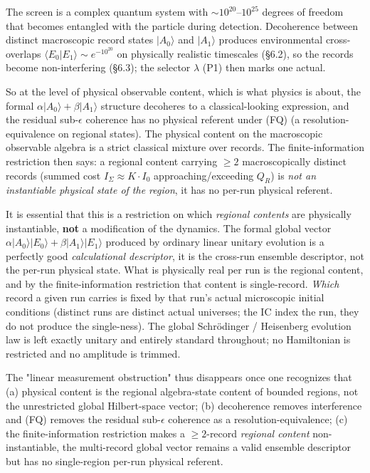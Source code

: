 \documentclass[11pt,a4paper]{article}
\begin{document}
The screen is a complex quantum system with $\sim 10^{20}$–$10^{25}$ degrees of freedom that becomes entangled with the particle during detection. Decoherence between distinct macroscopic record states $|A_0\rangle$ and $|A_1\rangle$ produces environmental cross-overlaps $\langle E_0 | E_1 \rangle \sim e^{-10^{20}}$ on physically realistic timescales (§6.2), so the records become non-interfering (§6.3); the selector $\lambda$ (P1) then marks one actual.

So at the level of physical observable content, which is what physics is about, the formal $\alpha|A_0\rangle + \beta|A_1\rangle$ structure decoheres to a classical-looking expression, and the residual sub-$\epsilon$ coherence has no physical referent under (FQ) (a resolution-equivalence on regional states). The physical content on the macroscopic observable algebra is a strict classical mixture over records. The finite-information restriction then says: a regional content carrying $\ge 2$ macroscopically distinct records (summed cost $I_\Sigma \approx K\cdot I_0$ approaching/exceeding $Q_R$) is \emph{not an instantiable physical state of the region}, it has no per-run physical referent.

It is essential that this is a restriction on which \emph{regional contents} are physically instantiable, \textbf{not} a modification of the dynamics. The formal global vector $\alpha|A_0\rangle|E_0\rangle + \beta|A_1\rangle|E_1\rangle$ produced by ordinary linear unitary evolution is a perfectly good \emph{calculational descriptor}, it is the cross-run ensemble descriptor, not the per-run physical state. What is physically real per run is the regional content, and by the finite-information restriction that content is single-record. \emph{Which} record a given run carries is fixed by that run's actual microscopic initial conditions (distinct runs are distinct actual universes; the IC index the run, they do not produce the single-ness). The global Schrödinger / Heisenberg evolution law is left exactly unitary and entirely standard throughout; no Hamiltonian is restricted and no amplitude is trimmed.

The "linear measurement obstruction" thus disappears once one recognizes that (a) physical content is the regional algebra-state content of bounded regions, not the unrestricted global Hilbert-space vector; (b) decoherence removes interference and (FQ) removes the residual sub-$\epsilon$ coherence as a resolution-equivalence; (c) the finite-information restriction makes a $\ge 2$-record \emph{regional content} non-instantiable, the multi-record global vector remains a valid ensemble descriptor but has no single-region per-run physical referent.
\end{document}

